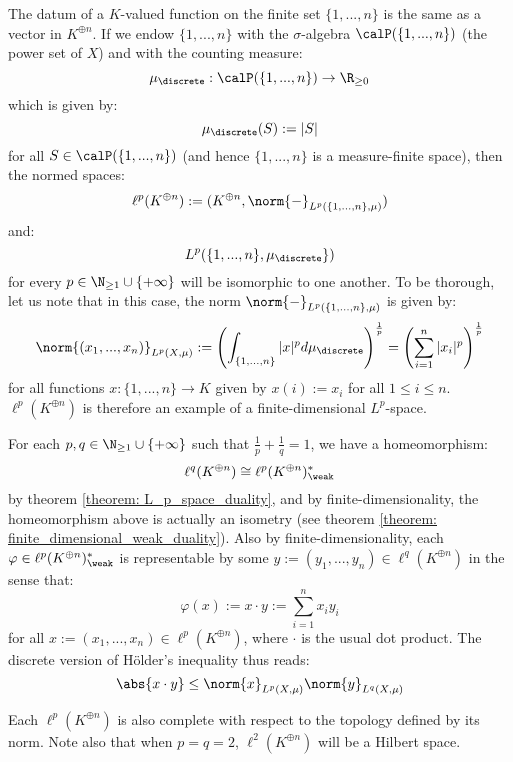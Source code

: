         \begin{example} \label{example: ell_p_spaces}
            The datum of a $K$-valued function on the finite set $\{1, ..., n\}$ is the same as a vector in $K^{\oplus n}$. If we endow $\{1, ..., n\}$ with the $\sigma$-algebra $\calP(\{1, ..., n\})$ (the power set of $X$) and with the counting measure:
                $$\mu_{\discrete}: \calP(\{1, ..., n\}) \to \R_{\geq 0}$$
            which is given by:
                $$\mu_{\discrete}(S) := |S|$$
            for all $S \in \calP(\{1, ..., n\})$ (and hence $\{1, ..., n\}$ is a measure-finite space), then the normed spaces:
                $$\ell^p(K^{\oplus n}) := (K^{\oplus n}, \norm{-}_{L^p(\{1, ..., n\}, \mu)})$$
            and:
                $$L^p(\{1, ..., n\}, \mu_{\discrete}\})$$
            for every $p \in \N_{\geq 1} \cup \{+\infty\}$ will be isomorphic to one another. To be thorough, let us note that in this case, the norm $\norm{-}_{L^p(\{1, ..., n\}, \mu)}$ is given by:
                $$\norm{(x_1, ..., x_n)}_{L^p(X, \mu)} := \left( \int_{\{1, ..., n\}} |x|^p d\mu_{\discrete} \right)^{\frac1p} = \left( \sum_{i = 1}^n |x_i|^p \right)^{\frac1p}$$
            for all functions $x: \{1, ..., n\} \to K$ given by $x(i) := x_i$ for all $1 \leq i \leq n$. $\ell^p(K^{\oplus n})$ is therefore an example of a finite-dimensional $L^p$-space.

            For each $p, q \in \N_{\geq 1} \cup \{+\infty\}$ such that $\frac1p + \frac1q = 1$, we have a homeomorphism:
                $$\ell^q(K^{\oplus n}) \cong \ell^p(K^{\oplus n})^*_{\weak}$$
            by theorem \ref{theorem: L_p_space_duality}, and by finite-dimensionality, the homeomorphism above is actually an isometry (see theorem \ref{theorem: finite_dimensional_weak_duality}). Also by finite-dimensionality, each $\varphi \in \ell^p(K^{\oplus n})^*_{\weak}$ is representable by some $y := (y_1, ..., y_n) \in \ell^q(K^{\oplus n})$ in the sense that:
                $$\varphi(x) := x \cdot y := \sum_{i = 1}^n x_i y_i$$
            for all $x := (x_1, ..., x_n) \in \ell^p(K^{\oplus n})$, where $\cdot$ is the usual dot product. The discrete version of H\"older's inequality thus reads:
                $$\abs{x \cdot y} \leq \norm{x}_{L^p(X, \mu)} \norm{y}_{L^q(X, \mu)}$$

            Each $\ell^p(K^{\oplus n})$ is also complete with respect to the topology defined by its norm. Note also that when $p = q = 2$, $\ell^2(K^{\oplus n})$ will be a Hilbert space.
        \end{example}


